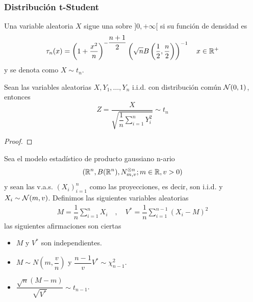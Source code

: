\subsubsection{Distribución t-Student}
\begin{definicion}
    Una variable aleatoria $X$ sigue una  sobre $]0,+\infty[$ si su función de densidad es
    \begin{equation*}
        \tau_n(x) =  \left( 1 + \dfrac{x^2}{n} \right)^{-\dfrac{n+1}{2}} \left(\sqrt{n}B\left(\dfrac{1}{2},\dfrac{n}{2}\right)\right)^{-1} \quad x\in \mathbb{R}^+
    \end{equation*}
    y se denota como $X \sim t_n$.
\end{definicion}

\begin{coro}
    Sean las variables aleatorias $X, Y_1, \ldots, Y_n$ i.i.d. con distribución común $\mathcal{N}(0,1)$, entonces 
    \begin{equation*}
        Z = \dfrac{X}{\sqrt{\dfrac{1}{n} \sum\limits_{i=1}^{n} Y_i^2}} \sim t_n
    \end{equation*}
    \begin{proof}
    \end{proof}
\end{coro}

\begin{teo}
    Sea el modelo estadístico de producto gaussiano n-ario
    \begin{equation*}
        (\mathbb{R}^n , B(\mathbb{R}^n) , N_{m,v}^{\otimes n} ; m \in \mathbb{R}, v>0)
    \end{equation*}
    y sean las v.a.s. $(X_i)_{i=1}^{n}$ como las proyecciones, es decir, son i.i.d. y $X_i\sim \mathcal{N}(m,v)$. Definimos las siguientes variables aleatorias
    \begin{align*}
        M = \dfrac{1}{n} \sum\limits_{i=1}^{n} X_i \quad , \quad V^* = \dfrac{1}{n} \sum\limits_{i=1}^{n-1} (X_i - M)^2 
    \end{align*}
    las siguientes afirmaciones son ciertas
    \begin{itemize}
        \item $M$ y $V^*$ son independientes.
        \item $M \sim N(m, \dfrac{v}{n})$ y $\dfrac{n-1}{v} V^* \sim \chi^2_{n-1}$.
        \item $\dfrac{\sqrt{n} (M - m)}{\sqrt{V^*}} \sim t_{n-1}$.
    \end{itemize}
\end{teo}


